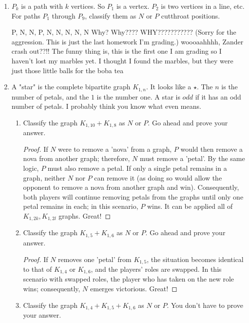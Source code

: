 \begin{enumerate}[leftmargin=*]
\begin{proof}
\end{proof}
\item $P_k$ is a path with $k$ vertices. So $P_1$ is a vertex. $P_2$ is two vertices in a line, etc. For paths $P_1$ through $P_9$, classify them as $N$ or $P$ cutthroat positions. 
\begin{solution}
P, N, N, P, N, N, N, N, N \color{red}Why? Why???? WHY??????????? (Sorry for the aggression. This is just the last homework I'm grading.) \color{black} \color{teal} woooaahhhh, Zander crash out??!! The funny thing is, this is the first one I am grading so I haven't lost my marbles yet. \color{black} \color{amethyst}I thought I found the marbles, but they were just those little balls for the boba tea\color{black}
\end{solution}
\item A "star" is the complete bipartite graph $K_{1,n}$. It looks like a $\star$. The $n$ is the number of petals, and the $1$ is the number one. A star is $odd$ if it has an odd number of petals. I probably think you know what even means. 
\begin{enumerate}
\item Classify the graph $K_{1,10} + K_{1,8}$ as $N$ or $P$. Go ahead and prove your answer. 
\begin{proof}
If $N$ were to remove a 'nova' from a graph, $P$ would then remove a nova from another graph; therefore, $N$ must remove a 'petal'. By the same logic, $P$ must also remove a petal. If only a single petal remains in a graph, neither $N$ nor $P$ can remove it (as doing so would allow the opponent to remove a nova from another graph and win). Consequently, both players will continue removing petals from the graphs until only one petal remains in each; in this scenario, $P$ wins. It can be applied all of $K_{1,2k}, K_{1,2l}$ graphs. \color{red}Great!\color{black}
\end{proof}
\item Classify the graph $K_{1, 5} + K_{1, 6}$ as $N$ or $P$. Go ahead and prove your answer. 
\begin{proof}
    If $N$ removes one 'petal' from $K_{1,5}$, the situation becomes identical to that of $K_{1,4}$ or $K_{1,6}$, and the players' roles are swapped. In this scenario with swapped roles, the player who has taken on the new role wins; consequently, $N$ emerges victorious. \color{red}Great!\color{black}
\end{proof}
\item Classify the graph $K_{1, 4} + K_{1, 5} + K_{1, 6}$ as $N$ or $P$. You don't have to prove your answer. 

\end{enumerate}
\end{enumerate}
